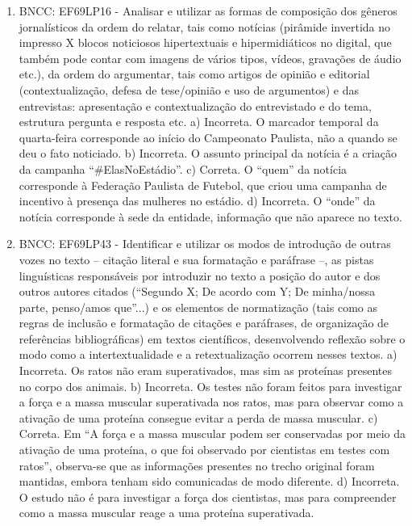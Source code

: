 \begin{enumerate}
\item
BNCC: EF69LP16 - Analisar e utilizar as formas de composição dos gêneros
jornalísticos da ordem do relatar, tais como notícias (pirâmide
invertida no impresso X blocos noticiosos hipertextuais e
hipermidiáticos no digital, que também pode contar com imagens de vários
tipos, vídeos, gravações de áudio etc.), da ordem do argumentar, tais
como artigos de opinião e editorial (contextualização, defesa de
tese/opinião e uso de argumentos) e das entrevistas: apresentação e
contextualização do entrevistado e do tema, estrutura pergunta e
resposta etc. a) Incorreta. O marcador temporal da quarta-feira corresponde ao início do Campeonato Paulista, não a quando se deu o fato noticiado. b) Incorreta. O assunto principal da notícia é a criação da campanha ``\#ElasNoEstádio''. c) Correta. O ``quem'' da notícia corresponde à Federação Paulista de Futebol, que criou uma campanha de incentivo à presença das mulheres no estádio. d) Incorreta. O ``onde'' da notícia corresponde à sede da entidade, informação que não aparece no texto.

\item
BNCC: EF69LP43 - Identificar e utilizar os modos de introdução de outras
vozes no texto -- citação literal e sua formatação e paráfrase --, as
pistas linguísticas responsáveis por introduzir no texto a posição do
autor e dos outros autores citados (``Segundo X; De acordo com Y; De
minha/nossa parte, penso/amos que''...) e os elementos de normatização
(tais como as regras de inclusão e formatação de citações e paráfrases,
de organização de referências bibliográficas) em textos científicos,
desenvolvendo reflexão sobre o modo como a intertextualidade e a
retextualização ocorrem nesses textos. a) Incorreta. Os ratos não eram superativados, mas sim as proteínas presentes no corpo dos animais. b) Incorreta. Os testes não foram feitos para investigar a força e a massa muscular superativada nos ratos, mas para observar como a ativação de uma proteína consegue evitar a perda de massa muscular. c) Correta. Em ``A força e a massa muscular podem ser conservadas por meio da ativação de uma proteína, o que foi observado por cientistas em testes com ratos'', observa-se que as informações presentes no trecho original foram mantidas, embora tenham sido comunicadas de modo diferente. d) Incorreta. O estudo não é para investigar a força dos cientistas, mas para compreender como a massa muscular reage a uma proteína superativada.


\end{enumerate}
